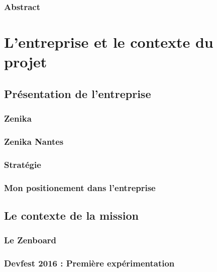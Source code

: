 \documentclass[twoside, 12pt]{report}
\begin{document}
\cleardoublepage
\setcounter{page}{1}
\section*{\textbf{Abstract}}
\label{sect:Abstract}


\part{L'entreprise et le contexte du projet}

    \chapter{Présentation de l'entreprise}
        

        \section{Zenika}
            

        \section{Zenika Nantes}
            

        \section{Stratégie}
            

        \section{Mon positionement dans l'entreprise}
        	

    \chapter{Le contexte de la mission}
        

        \section{Le Zenboard}
        	

        \section{Devfest 2016 : Première expérimentation }
            
\end{document}
